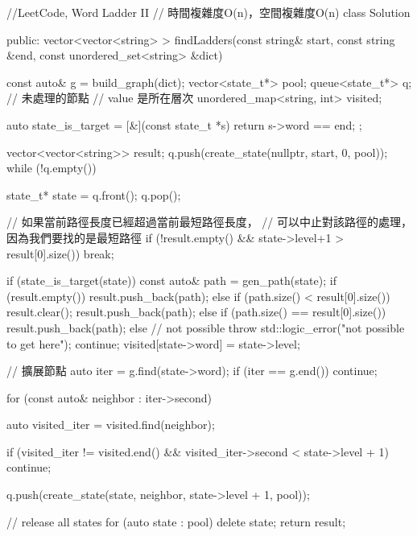 \begin{Code}
//LeetCode, Word Ladder II
// 時間複雜度O(n)，空間複雜度O(n)
class Solution {
public:
    vector<vector<string> > findLadders(const string& start,
            const string &end, const unordered_set<string> &dict) {
        const auto& g = build_graph(dict);
        vector<state_t*> pool;
        queue<state_t*> q; // 未處理的節點
        // value 是所在層次
        unordered_map<string, int> visited;

        auto state_is_target = [&](const state_t *s) {return s->word == end; };

        vector<vector<string>> result;
        q.push(create_state(nullptr, start, 0, pool));
        while (!q.empty()) {
            state_t* state = q.front();
            q.pop();

            // 如果當前路徑長度已經超過當前最短路徑長度，
            // 可以中止對該路徑的處理，因為我們要找的是最短路徑
            if (!result.empty() && state->level+1 > result[0].size()) break;

            if (state_is_target(state)) {
                const auto& path = gen_path(state);
                if (result.empty()) {
                    result.push_back(path);
                } else {
                    if (path.size() < result[0].size()) {
                        result.clear();
                        result.push_back(path);
                    } else if (path.size() == result[0].size()) {
                        result.push_back(path);
                    } else {
                        // not possible
                        throw std::logic_error("not possible to get here");
                    }
                }
                continue;
            }
            visited[state->word] = state->level;

            // 擴展節點
            auto iter = g.find(state->word);
            if (iter == g.end()) continue;

            for (const auto& neighbor : iter->second) {
                auto visited_iter = visited.find(neighbor);

                if (visited_iter != visited.end() && 
                    visited_iter->second < state->level + 1) {
                    continue;
                }

                q.push(create_state(state, neighbor, state->level + 1, pool));
            }
        }

        // release all states
        for (auto state : pool) {
            delete state;
        }
        return result;
    }

}
\end{Code}
